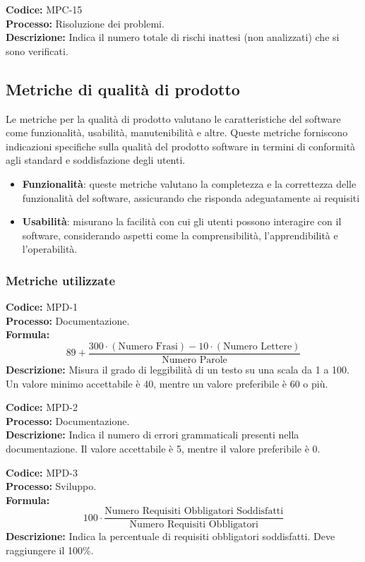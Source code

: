 \textbf{Codice:} MPC-15 \\
\textbf{Processo:} Risoluzione dei problemi. \\
\textbf{Descrizione:} Indica il numero totale di rischi inattesi (non analizzati) che si sono verificati.


\newpage
\subsection{Metriche di qualità di prodotto}
Le metriche per la qualità di prodotto valutano le caratteristiche del software come funzionalità, 
usabilità, manutenibilità e altre. Queste metriche forniscono indicazioni specifiche
sulla qualità del prodotto software in termini di conformità agli standard e soddisfazione
degli utenti.
\begin{itemize}
    \item \textbf{Funzionalità}: queste metriche valutano la completezza e la correttezza delle funzionalità del software,
    assicurando che risponda adeguatamente ai requisiti
    \item \textbf{Usabilità}: misurano la facilità con cui gli utenti possono interagire con il software, considerando aspetti
    come la comprensibilità, l’apprendibilità e l’operabilità.
\end{itemize}

\subsubsection{Metriche utilizzate}
\textbf{Codice:} MPD-1 \\
\textbf{Processo:} Documentazione. \\
\textbf{Formula:}
\[
89 + \frac{300 \cdot (\text{Numero Frasi}) - 10 \cdot (\text{Numero Lettere})}{\text{Numero Parole}}
\]
\textbf{Descrizione:} Misura il grado di leggibilità di un testo su una scala da 1 a 100. Un valore minimo accettabile è 40, mentre un valore preferibile è 60 o più.

\textbf{Codice:} MPD-2 \\
\textbf{Processo:} Documentazione. \\
\textbf{Descrizione:} Indica il numero di errori grammaticali presenti nella documentazione. Il valore accettabile è 5, mentre il valore preferibile è 0.


\textbf{Codice:} MPD-3 \\
\textbf{Processo:} Sviluppo. \\
\textbf{Formula:}
\[
100 \cdot \frac{\text{Numero Requisiti Obbligatori Soddisfatti}}{\text{Numero Requisiti Obbligatori}}
\]
\textbf{Descrizione:} Indica la percentuale di requisiti obbligatori soddisfatti. Deve raggiungere il 100\%.

